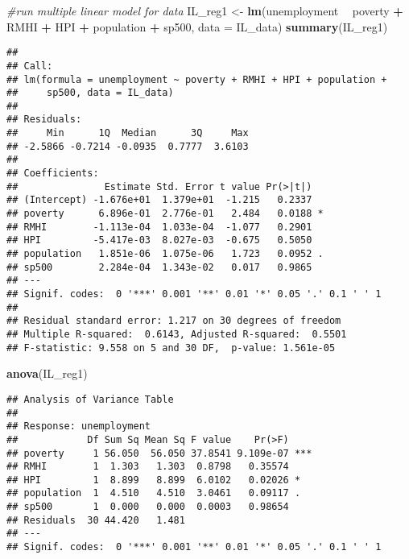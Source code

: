 \documentclass[
]{article}
\newenvironment{Shaded}{\begin{snugshade}}{\end{snugshade}}
\newcommand{\CommentTok}[1]{\textcolor[rgb]{0.56,0.35,0.01}{\textit{#1}}}
\newcommand{\DataTypeTok}[1]{\textcolor[rgb]{0.13,0.29,0.53}{#1}}
\newcommand{\KeywordTok}[1]{\textcolor[rgb]{0.13,0.29,0.53}{\textbf{#1}}}
\newcommand{\NormalTok}[1]{#1}
\newcommand{\OperatorTok}[1]{\textcolor[rgb]{0.81,0.36,0.00}{\textbf{#1}}}
\newcommand{\StringTok}[1]{\textcolor[rgb]{0.31,0.60,0.02}{#1}}
\begin{document}
\begin{Shaded}
\begin{Highlighting}[]
\CommentTok{#run multiple linear model for data}
\NormalTok{IL_reg1 <-}\StringTok{ }\KeywordTok{lm}\NormalTok{(unemployment }\OperatorTok{~}\StringTok{ }\NormalTok{poverty }\OperatorTok{+}\StringTok{ }\NormalTok{RMHI }\OperatorTok{+}\StringTok{ }\NormalTok{HPI }\OperatorTok{+}\StringTok{ }\NormalTok{population }\OperatorTok{+}\StringTok{ }\NormalTok{sp500, }\DataTypeTok{data =}\NormalTok{ IL_data)}
\KeywordTok{summary}\NormalTok{(IL_reg1)}
\end{Highlighting}
\end{Shaded}

\begin{verbatim}
## 
## Call:
## lm(formula = unemployment ~ poverty + RMHI + HPI + population + 
##     sp500, data = IL_data)
## 
## Residuals:
##     Min      1Q  Median      3Q     Max 
## -2.5866 -0.7214 -0.0935  0.7777  3.6103 
## 
## Coefficients:
##               Estimate Std. Error t value Pr(>|t|)  
## (Intercept) -1.676e+01  1.379e+01  -1.215   0.2337  
## poverty      6.896e-01  2.776e-01   2.484   0.0188 *
## RMHI        -1.113e-04  1.033e-04  -1.077   0.2901  
## HPI         -5.417e-03  8.027e-03  -0.675   0.5050  
## population   1.851e-06  1.075e-06   1.723   0.0952 .
## sp500        2.284e-04  1.343e-02   0.017   0.9865  
## ---
## Signif. codes:  0 '***' 0.001 '**' 0.01 '*' 0.05 '.' 0.1 ' ' 1
## 
## Residual standard error: 1.217 on 30 degrees of freedom
## Multiple R-squared:  0.6143, Adjusted R-squared:  0.5501 
## F-statistic: 9.558 on 5 and 30 DF,  p-value: 1.561e-05
\end{verbatim}

\begin{Shaded}
\begin{Highlighting}[]
\KeywordTok{anova}\NormalTok{(IL_reg1)}
\end{Highlighting}
\end{Shaded}

\begin{verbatim}
## Analysis of Variance Table
## 
## Response: unemployment
##            Df Sum Sq Mean Sq F value    Pr(>F)    
## poverty     1 56.050  56.050 37.8541 9.109e-07 ***
## RMHI        1  1.303   1.303  0.8798   0.35574    
## HPI         1  8.899   8.899  6.0102   0.02026 *  
## population  1  4.510   4.510  3.0461   0.09117 .  
## sp500       1  0.000   0.000  0.0003   0.98654    
## Residuals  30 44.420   1.481                      
## ---
## Signif. codes:  0 '***' 0.001 '**' 0.01 '*' 0.05 '.' 0.1 ' ' 1
\end{verbatim}
\end{document}
